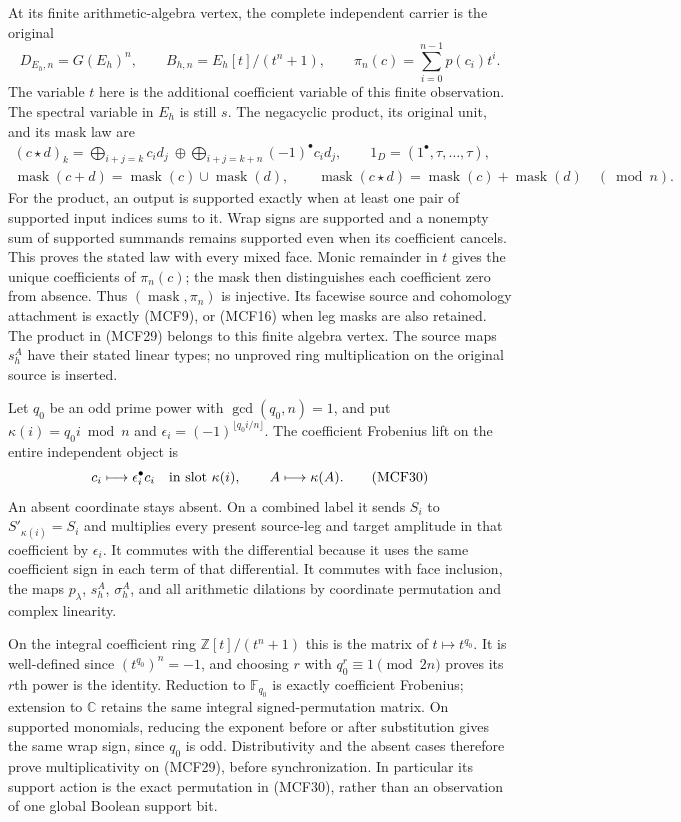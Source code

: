 At its finite arithmetic-algebra vertex, the complete independent carrier
is the original
\[
D_{E_h,n}=G(E_h)^n,\qquad B_{h,n}=E_h[t]/(t^n+1),\qquad
\pi_n(c)=\sum_{i=0}^{n-1}p(c_i)t^i.
\tag{MCF28}
\]
The variable $t$ here is the additional coefficient variable of this
finite observation.  The spectral variable in $E_h$ is still $s$.
The negacyclic product, its original unit, and its mask law are
\[
\begin{gathered}
(c\star d)_k=\mathop{\bigoplus}_{i+j=k}c_id_j\ \oplus\!
             \mathop{\bigoplus}_{i+j=k+n}(-1)^\bullet c_id_j,
\qquad 1_D=(1^\bullet,\tau,\ldots,\tau),\\
\operatorname{mask}(c+d)=\operatorname{mask}(c)\cup\operatorname{mask}(d),\qquad
\operatorname{mask}(c\star d)
 =\operatorname{mask}(c)+\operatorname{mask}(d)\quad(\bmod n).
\end{gathered}
\tag{MCF29}
\]
For the product, an output is supported exactly when at least one pair
of supported input indices sums to it.  Wrap signs are supported and a
nonempty sum of supported summands remains supported even when its
coefficient cancels.  This proves the stated law with every mixed face.
Monic remainder in $t$ gives the unique coefficients of $\pi_n(c)$;
the mask then distinguishes each coefficient zero from absence.  Thus
$(\operatorname{mask},\pi_n)$ is injective.  Its facewise source and
cohomology attachment is exactly (MCF9), or (MCF16) when leg masks are
also retained.  The product in (MCF29) belongs to this finite algebra
vertex.  The source maps $s_h^A$ have their stated linear types; no
unproved ring multiplication on the original source is inserted.

Let $q_0$ be an odd prime power with $\gcd(q_0,n)=1$, and put
$\kappa(i)=q_0i\bmod n$ and
$\epsilon_i=(-1)^{\lfloor q_0i/n\rfloor}$.  The coefficient Frobenius
lift on the entire independent object is
\[
c_i\longmapsto\epsilon_i^\bullet c_i
       \quad\hbox{in slot }\kappa(i),\qquad
A\longmapsto\kappa(A).
\tag{MCF30}
\]
An absent coordinate stays absent.  On a combined label it sends
$S_i$ to $S'_{\kappa(i)}=S_i$ and multiplies every present source-leg
and target amplitude in that coefficient by $\epsilon_i$.  It commutes
with the differential because it uses the same coefficient sign in
each term of that differential.  It commutes with face inclusion,
the maps $p_\lambda$, $s_h^A$, $\sigma_h^A$, and all arithmetic dilations
by coordinate permutation and complex linearity.

On the integral coefficient ring $\mathbb Z[t]/(t^n+1)$ this is the
matrix of $t\mapsto t^{q_0}$.  It is well-defined since
$(t^{q_0})^n=-1$, and choosing $r$ with $q_0^r\equiv1\pmod{2n}$
proves its $r$th power is the identity.  Reduction to $\mathbb F_{q_0}$
is exactly coefficient Frobenius; extension to $\mathbb C$ retains the
same integral signed-permutation matrix.  On supported monomials,
reducing the exponent before or after substitution gives the same
wrap sign, since $q_0$ is odd.  Distributivity and the absent cases
therefore prove multiplicativity on (MCF29), before synchronization.
In particular its support action is the exact permutation in (MCF30),
rather than an observation of one global Boolean support bit.

